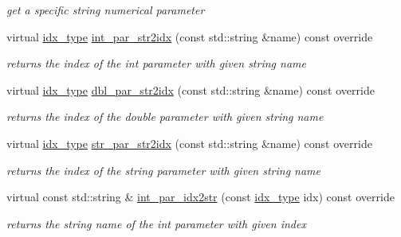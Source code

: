 \begin{Indent}
\begin{DoxyCompactItemize}
\begin{DoxyCompactList}\small\item\em get a specific string numerical parameter \end{DoxyCompactList}\item 
virtual \mbox{\hyperlink{class_s_m_spp__di__unipi__it_1_1_thin_compute_interface_aa3d710629ad8c434286726ad810c3b47}{idx\+\_\+type}} \mbox{\hyperlink{class_s_m_spp__di__unipi__it_1_1_f_real_objective_ae281b6699b0707a5cdc1e82b76d26c09}{int\+\_\+par\+\_\+str2idx}} (const std\+::string \&name) const override
\begin{DoxyCompactList}\small\item\em returns the index of the int parameter with given string name \end{DoxyCompactList}\item 
virtual \mbox{\hyperlink{class_s_m_spp__di__unipi__it_1_1_thin_compute_interface_aa3d710629ad8c434286726ad810c3b47}{idx\+\_\+type}} \mbox{\hyperlink{class_s_m_spp__di__unipi__it_1_1_f_real_objective_a6d353ac3d1200d9bea89235da61bc4f3}{dbl\+\_\+par\+\_\+str2idx}} (const std\+::string \&name) const override
\begin{DoxyCompactList}\small\item\em returns the index of the double parameter with given string name \end{DoxyCompactList}\item 
virtual \mbox{\hyperlink{class_s_m_spp__di__unipi__it_1_1_thin_compute_interface_aa3d710629ad8c434286726ad810c3b47}{idx\+\_\+type}} \mbox{\hyperlink{class_s_m_spp__di__unipi__it_1_1_f_real_objective_a0ddaa949b3db7b6adeb4ed8d623637ca}{str\+\_\+par\+\_\+str2idx}} (const std\+::string \&name) const override
\begin{DoxyCompactList}\small\item\em returns the index of the string parameter with given string name \end{DoxyCompactList}\item 
virtual const std\+::string \& \mbox{\hyperlink{class_s_m_spp__di__unipi__it_1_1_f_real_objective_a61e973f39747f63b8f56d97cc62e32ce}{int\+\_\+par\+\_\+idx2str}} (const \mbox{\hyperlink{class_s_m_spp__di__unipi__it_1_1_thin_compute_interface_aa3d710629ad8c434286726ad810c3b47}{idx\+\_\+type}} idx) const override
\begin{DoxyCompactList}\small\item\em returns the string name of the int parameter with given index \end{DoxyCompactList}\item 

\end{DoxyCompactItemize}
\end{Indent}
